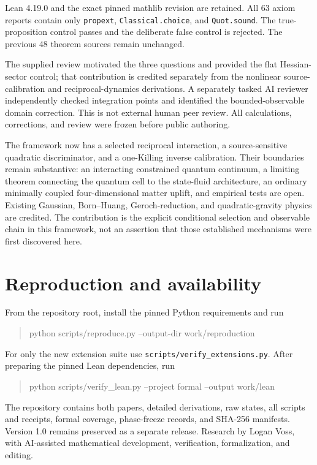 \documentclass[11pt]{article}
\begin{document}
Lean 4.19.0 and the exact pinned mathlib revision are retained. All 63 axiom reports contain only \texttt{propext}, \texttt{Classical.choice}, and \texttt{Quot.sound}. The true-proposition control passes and the deliberate false control is rejected. The previous 48 theorem sources remain unchanged.

The supplied review motivated the three questions and provided the flat Hessian-sector control; that contribution is credited separately from the nonlinear source-calibration and reciprocal-dynamics derivations. A separately tasked AI reviewer independently checked integration points and identified the bounded-observable domain correction. This is not external human peer review. All calculations, corrections, and review were frozen before public authoring.

The framework now has a selected reciprocal interaction, a source-sensitive quadratic discriminator, and a one-Killing inverse calibration. Their boundaries remain substantive: an interacting constrained quantum continuum, a limiting theorem connecting the quantum cell to the state-fluid architecture, an ordinary minimally coupled four-dimensional matter uplift, and empirical tests are open. Existing Gaussian, Born--Huang, Geroch-reduction, and quadratic-gravity physics are credited. The contribution is the explicit conditional selection and observable chain in this framework, not an assertion that those established mechanisms were first discovered here.

\section*{Reproduction and availability}
From the repository root, install the pinned Python requirements and run
\begin{quote}\small\ttfamily
python scripts/reproduce.py --output-dir work/reproduction
\end{quote}
For only the new extension suite use \texttt{scripts/verify\_extensions.py}. After preparing the pinned Lean dependencies, run
\begin{quote}\small\ttfamily
python scripts/verify\_lean.py --project formal --output work/lean
\end{quote}
The repository contains both papers, detailed derivations, raw states, all scripts and receipts, formal coverage, phase-freeze records, and SHA-256 manifests. Version 1.0 remains preserved as a separate release. Research by Logan Voss, with AI-assisted mathematical development, verification, formalization, and editing.
\end{document}
